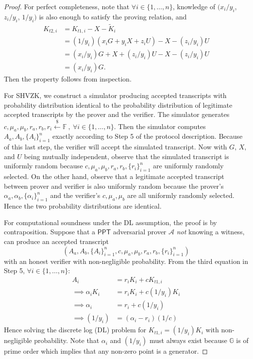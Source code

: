 \documentclass{article}
\theoremstyle{plain}
\theoremstyle{remark}
\begin{document}
\begin{proof}
For perfect completeness, note that $\forall i\in\{1,\ldots,n\}$, knowledge of $(x_i/y_i$, $z_i/y_i$, $1/y_i)$ is also enough to satisfy the proving relation, and
\begin{align*}
K_{t2,i} &= K_{t1,i} - X - \tilde{K}_i \\ &= (1/y_i)(x_i G + y_i X + z_i U) - X - (z_i/y_i)U \\
&= (x_i/y_i)G + X + (z_i/y_i) U - X - (z_i/y_i)U \\ &= (x_i/y_i)G.
\end{align*}
Then the property follows from inspection.

For SHVZK, we construct a simulator producing accepted transcripts with probability distribution identical to the probability distribution of legitimate accepted transcripts by the prover and the verifier. The simulator generates $c, \mu_a, \mu_b, r_a, r_b, r_i \xleftarrow{\$}\mathbb{F}\ ,\ \forall i\in\{1,\ldots,n\}$. Then the simulator computes $A_{a}, A_{b}, \{A_{i}\}_{i=1}^n$ exactly according to Step 5 of the protocol description. Because of this last step, the verifier will accept the simulated transcript. Now with $G$, $X$, and $U$ being mutually independent, observe that the simulated transcript is uniformly random because $c, \mu_a, \mu_b, r_a, r_b, \{r_i\}_{i=1}^n$ are uniformly randomly selected. On the other hand, observe that a legitimate accepted transcript between prover and verifier is also uniformly random because the prover's $\alpha_a, \alpha_b, \{\alpha_i\}_{i=1}^n$ and the verifier's $c, \mu_a, \mu_b$ are all uniformly randomly selected. Hence the two probability distributions are identical.

For computational soundness under the DL assumption, the proof is by contraposition. Suppose that a $\textsf{PPT}$ adversarial prover $\mathcal{A}$ \textit{not} knowing a witness, can produce an accepted transcript $$(A_a, A_b, \{A_i\}_{i=1}^n,c, \mu_a, \mu_b, r_a, r_b, \{r_i\}_{i=1}^n)$$ with an honest verifier with non-negligible probability. From the third equation in Step 5, $\forall i\in\{1,\ldots,n\}$:
\begin{align*}
A_{i} &= r_i K_i + c K_{t1,i} \\
\implies\alpha_i K_i &= r_i K_i + c (1/y_i)K_i \\
\implies\alpha_i &= r_i + c(1/y_i) \\
\implies(1/y_i) &= (\alpha_i - r_i)(1/c)
\end{align*}
Hence solving the discrete log (DL) problem for $K_{t1,i} = (1/y_i)K_i$ with non-negligible probability. Note that $\alpha_i$ and $(1/y_i)$ must always exist because $\mathbb{G}$ is of prime order which implies that any non-zero point is a generator.
\end{proof}
\end{document}
